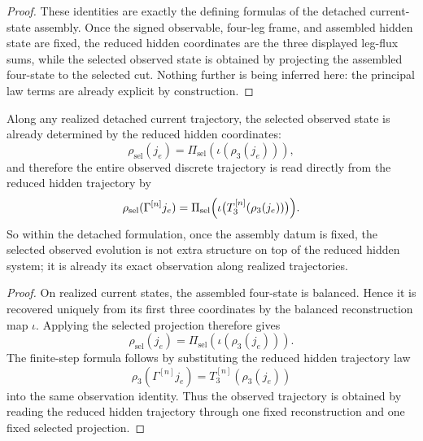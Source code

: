 \begin{proof}
These identities are exactly the defining formulas of the detached
current-state assembly. Once the signed observable, four-leg frame, and assembled
hidden state are fixed, the reduced hidden coordinates are the three displayed
leg-flux sums, while the selected observed state is obtained by projecting the
assembled four-state to the selected cut. Nothing further is being inferred
here: the principal law terms are already explicit by construction.
\end{proof}

\begin{corollary}
\label{thm:selected-observed-trajectory-is-read-directly-from-reduced-hidden-coordinates}
Along any realized detached current trajectory, the selected observed state is
already determined by the reduced hidden coordinates:
\[
\rho_{\mathrm{sel}}(j_e)
=
\Pi_{\mathrm{sel}}(\iota(\rho_3(j_e))),
\]
and therefore the entire observed discrete trajectory is read directly from the
reduced hidden trajectory by
\[
\rho_{\mathrm{sel}}(\Gamma^{[n]} j_e)
=
\Pi_{\mathrm{sel}}
\Bigl(
\iota\bigl(T_3^{[n]}(\rho_3(j_e))\bigr)
\Bigr).
\]
So within the detached formulation, once the assembly datum is fixed, the selected
observed evolution is not extra structure on top of the reduced hidden system;
it is already its exact observation along realized trajectories.
\end{corollary}

\begin{proof}
On realized current states, the assembled four-state is balanced. Hence it is
recovered uniquely from its first three coordinates by the balanced
reconstruction map \(\iota\). Applying the selected projection therefore gives
\[
\rho_{\mathrm{sel}}(j_e)=\Pi_{\mathrm{sel}}(\iota(\rho_3(j_e))).
\]
The finite-step formula follows by substituting the reduced hidden trajectory
law
\[
\rho_3(\Gamma^{[n]}j_e)=T_3^{[n]}(\rho_3(j_e))
\]
into the same observation identity. Thus the observed trajectory is obtained by
reading the reduced hidden trajectory through one fixed reconstruction and one
fixed selected projection.
\end{proof}

